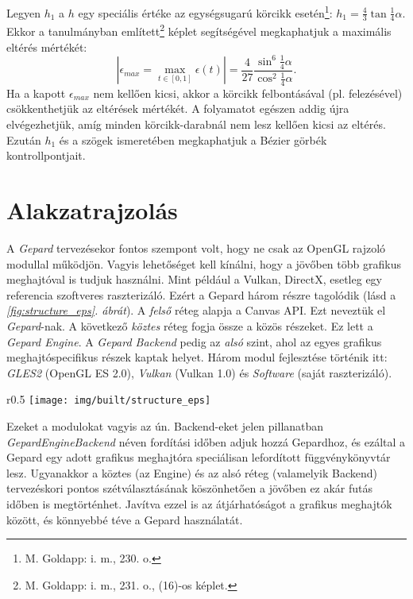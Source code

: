 \documentclass[12pt]{report}
\theoremstyle{definition}
\newcommand{\func}[1]{{\textsl{#1}}}
\newcommand{\melyikoldalra}{r}
\begin{document}
Legyen $h_1$ a $h$ egy speciális értéke az egységsugarú körcikk
esetén\footnote{M. Goldapp: i. m., 230. o.}: $h_1 = \frac{4}{3} \tan{\frac{1}{4}
\alpha}$. Ekkor a \cite[Goldapp]{Goldapp:1991:approximation} tanulmányban
említett\footnote{M.  Goldapp: i. m., 231. o., (16)-os képlet.} képlet
segítségével megkaphatjuk a maximális eltérés mértékét: \begin{equation}
\label{eq:2} |\epsilon_{max} = \max_{{t\in[0, 1]}} \epsilon(t)| = \frac{4}{27}
\frac{\sin^6{\frac{1}{4} \alpha}}{\cos^2{\frac{1}{4} \alpha}}. \end{equation} Ha
a kapott $\epsilon_{max}$ nem kellően kicsi, akkor a körcikk felbontásával (pl.
felezésével) csökkenthetjük az eltérések mértékét. A folyamatot egészen addig
újra elvégezhetjük, amíg minden körcikk-darabnál nem lesz kellően kicsi az
eltérés. Ezután $h_1$ és a szögek ismeretében megkaphatjuk a Bézier görbék
kontrollpontjait.



    \chapter{Alakzatrajzolás}

A \emph{Gepard} tervezésekor fontos szempont volt, hogy ne csak az OpenGL
rajzoló modullal működjön. Vagyis lehetőséget kell kínálni, hogy a jövőben több
grafikus meghajtóval is tudjuk használni. Mint például a Vulkan, DirectX,
esetleg egy referencia szoftveres raszterizáló. Ezért a Gepard három részre
tagolódik (lásd a \emph{\ref{fig:structure_eps}. ábrát}). A \emph{felső} réteg
alapja a Canvas API. Ezt neveztük el \emph{Gepard}-nak. A következő
\emph{köztes} réteg fogja össze a közös részeket. Ez lett a \emph{Gepard
Engine}. A \emph{Gepard Backend} pedig az \emph{alsó} szint, ahol az egyes
grafikus meghajtóspecifikus részek kaptak helyet. Három modul fejlesztése
történik itt: \emph{GLES2} (OpenGL ES 2.0), \emph{Vulkan} (Vulkan 1.0) és
\emph{Software} (saját raszterizáló).
  \begin{wrapfigure}{\melyikoldalra}{0.5\textwidth}
    \texttt{[image: img/built/structure\_eps]}
    \caption{\label{fig:structure_eps} A három fő réteg}
  \end{wrapfigure}
Ezeket a modulokat vagyis az ún. Backend-eket jelen pillanatban
\func{GepardEngineBackend} néven fordítási időben adjuk hozzá Gepardhoz, és
ezáltal a Gepard egy adott grafikus meghajtóra speciálisan lefordított
függvénykönyvtár lesz. Ugyanakkor a köztes (az Engine) és az alsó réteg
(valamelyik Backend) tervezéskori pontos szétválasztásának köszönhetően a
jövőben ez akár futás időben is megtörténhet. Javítva ezzel is az átjárhatóságot
a grafikus meghajtók között, és könnyebbé téve a Gepard használatát.
\end{document}
